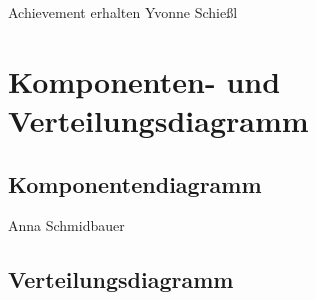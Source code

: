 \documentclass[a4paper, 12pp]{article}
\begin{document}
{\Large Achievement erhalten}
Yvonne Schießl
\begin{figure}[H] 
\centering
	\fbox{\begin{minipage}{16cm} 
	\end{minipage}}
\end{figure}

\section{Komponenten- und Verteilungsdiagramm}
\subsection{Komponentendiagramm}

Anna Schmidbauer
\begin{figure}[H] 
\centering
	\fbox{\begin{minipage}{16cm} 
	\end{minipage}}
\end{figure}

\subsection{Verteilungsdiagramm}
\end{document}
